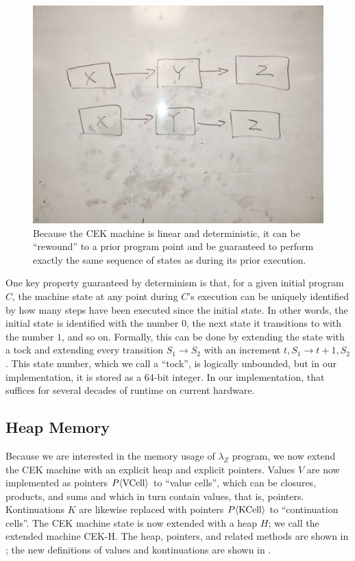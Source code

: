 \begin{figure}
\includegraphics[width=0.5\columnwidth]{img0}
\caption{
  Because the CEK machine is linear and deterministic,
    it can be ``rewound'' to a prior program point
    and be guaranteed to perform exactly the same sequence of states
    as during its prior execution.
  }
\label{fig:replayability}
\end{figure}

One key property guaranteed by determinism is that, for a given
initial program $C$, the machine state at any point during $C$'s
execution can be uniquely identified by how many steps have been
executed since the initial state. In other words, the initial state is
identified with the number $0$, the next state it transitions to with
the number $1$, and so on. Formally, this can be done by extending the
state with a tock and extending every transition $S_1 \to S_2$ with an
increment $t, S_1 \to t + 1, S_2$. This state number, which we call a
``tock'', is logically unbounded, but in our implementation, it is
stored as a 64-bit integer. In our implementation, that suffices for
several decades of runtime on current hardware.

\subsection{Heap Memory}

Because we are interested in
  the memory usage of $\lambda_Z$ program,
  we now extend the CEK machine with an explicit heap
  and explicit pointers.
Values $V$ are now implemented as pointers
  $P\langle \text{\textnormal{VCell}} \rangle$ to ``value cells'',
  which can be closures, products, and sums
  and which in turn contain values, that is, pointers.
Kontinuations $K$ are likewise replaced
  with pointers $P\langle \text{\textnormal{KCell}} \rangle$
  to ``continuation cells''.
The CEK machine state is now extended
  with a heap $H$;
  we call the extended machine CEK-H.
The heap, pointers, and related methods
  are shown in ;
  the new definitions of values and kontinuations
  are shown in .


